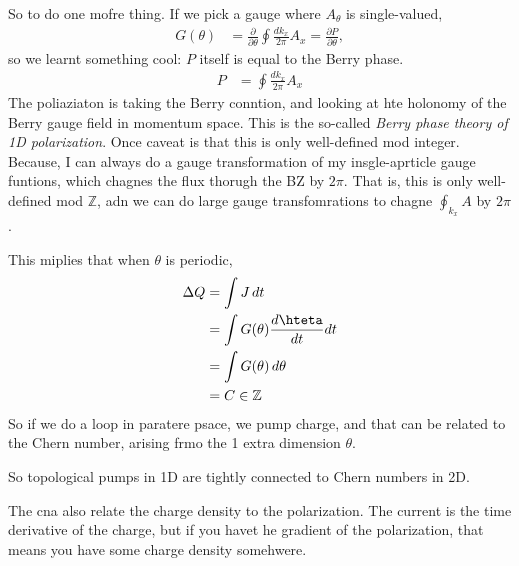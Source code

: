 So to do one mofre thing.
If we pick a gauge where $A_\theta$ is single-valued,
\begin{align}
    G(\theta) &=
    \frac{\partial}{\partial\theta}
    \oint \frac{dk_x}{2\pi} A_x
    = \frac{\partial P}{\partial \theta},
\end{align}
so we learnt something cool:
$P$ itself is equal to the Berry phase.
\begin{align}
    P &=
    \oint \frac{dk_x}{2\pi}A_x
\end{align}
The poliaziaton is taking the Berry conntion,
and looking at hte holonomy of the Berry gauge field in momentum space.
This is the so-called
\emph{Berry phase theory of 1D polarization}.
Once caveat is that this is only well-defined mod integer.
Because,
I can always do a gauge transformation of my insgle-aprticle gauge funtions,
which chagnes the flux thorugh the BZ by $2\pi$.
That is,
this is only well-defined mod $\mathbb{Z}$,
adn we can do large gauge transfomrations to chagne
$\oint_{k_x} A$ by $2\pi$.

This miplies that when $\theta$ is periodic,
\begin{align}
    \Delta Q &=
    \int J\, dt\\
    &= \int G(\theta) \frac{d\hteta}{dt}dt\\
    &=
    \int G(\theta)\, d\theta\\
    &= C \in \mathbb{Z}
\end{align}
So if we do a loop in paratere psace,
we pump charge,
and that can be related to the Chern number,
arising frmo the 1 extra dimension $\theta$.

So topological pumps in 1D are tightly connected to Chern numbers in 2D.

The cna also relate the charge density to the polarization.
The current is the time derivative of the charge,
but if you havet he gradient of the polarization,
that means you have some charge density somehwere.

